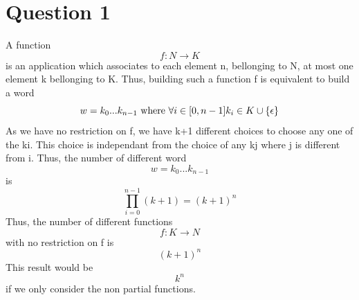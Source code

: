\documentclass[a4paper,10pt]{article}
\begin{document}
\section{Question 1}
    A function \begin{equation} f: N \rightarrow K \end{equation} is an application which associates to each element n, bellonging to N, at most one element k bellonging to K.\newline
    Thus, building such a function f is equivalent to build a word \begin{equation} w = k_{0}...k_{n-1} \mbox{  where  } \forall i \in [0, n-1] \space k_{i} \in K \cup \left \{ {\epsilon} \right \} \end{equation}
    As we have no restriction on f, we have k+1 different choices to choose any one of the ki.   This choice is independant from the choice of any kj where j is different from i.
    Thus, the number of different word
    \begin{equation} w = k_{0}...k_{n-1} \end{equation}
    is
    \begin{equation} \prod_{i=0}^{n-1} (k+1) = (k+1)^n\end{equation}
    Thus, the number of different functions \begin{equation} f : K \rightarrow N \end{equation} with no restriction on f is \begin{equation} (k+1)^n\end{equation}
    This result would be \begin{equation} k^n \end{equation} if we only consider the non partial functions.
\end{document}
